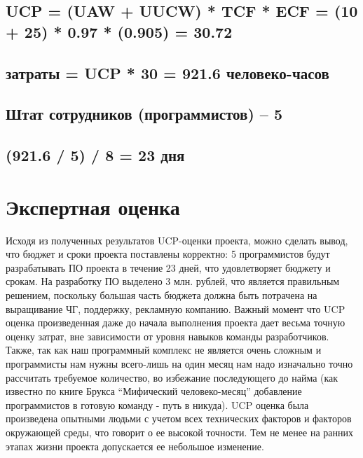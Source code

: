 \documentclass{article}
\begin{document}
\subsection*{\textbf {UCP = (UAW + UUCW) * TCF * ECF = (10 + 25) * 0.97 * (0.905) = 30.72}}
\subsection*{\textbf {затраты = UCP * 30 = 921.6 человеко-часов}}
\subsection*{\textbf {Штат сотрудников (программистов) -- 5}}
\subsection*{\textbf {(921.6 / 5) / 8 = 23 дня}}

\section{Экспертная оценка}
Исходя из полученных результатов UCP-оценки проекта, можно сделать вывод, что бюджет и сроки проекта поставлены корректно: 5 программистов будут разрабатывать ПО проекта в течение 23 дней, что удовлетворяет бюджету и срокам.
На разработку ПО выделено 3 млн. рублей, что является правильным решением, поскольку большая часть бюджета должна быть потрачена на выращивание ЧГ, поддержку, рекламную компанию.  Важный момент что UCP оценка произведенная даже до начала выполнения проекта дает весьма точную оценку затрат, вне зависимости от уровня навыков команды разработчиков. Также, так как наш программный комплекс не является очень сложным и программисты нам нужны всего-лишь на один месяц нам надо изначально точно рассчитать требуемое количество, во избежание последующего до найма (как известно по книге Брукса “Мифический человеко-месяц” добавление программистов в готовую команду - путь в никуда). UCP оценка была произведена опытными людьми с учетом всех технических факторов и факторов окружающей среды, что говорит о ее высокой точности. Тем не менее на ранних этапах жизни проекта допускается ее небольшое изменение.
\end{document}
